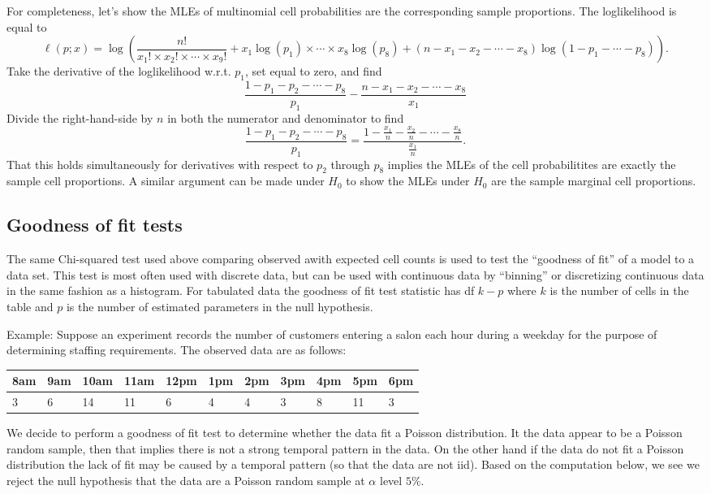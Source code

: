 \documentclass[]{book}
\begin{document}
For completeness, let's show the MLEs of multinomial cell probabilities
are the corresponding sample proportions. The loglikelihood is equal to
\[\ell(p;x) = \log \left(\frac{n!}{x_1!\times x_2!\times \cdots\times x_9!} + x_1\log(p_1) \times \cdots \times x_8 \log(p_8) + (n-x_1-x_2-\cdots -x_8)\log(1-p_1-\cdots -p_8)\right).\]
Take the derivative of the loglikelihood w.r.t. \(p_1\), set equal to
zero, and find
\[\frac{1 - p_1 - p_2 - \cdots - p_8}{p_1} - \frac{n-x_1-x_2-\cdots -x_8}{x_1}\]
Divide the right-hand-side by \(n\) in both the numerator and
denominator to find
\[\frac{1 - p_1 - p_2 - \cdots - p_8}{p_1} = \frac{1-\frac{x_1}{n} - \frac{x_2}{n}-\cdots - \frac{x_8}{n}}{\frac{x_1}{n}}.\]
That this holds simultaneously for derivatives with respect to \(p_2\)
through \(p_8\) implies the MLEs of the cell probabilitites are exactly
the sample cell proportions. A similar argument can be made under
\(H_0\) to show the MLEs under \(H_0\) are the sample marginal cell
proportions.

\subsection{Goodness of fit tests}\label{goodness-of-fit-tests}

The same Chi-squared test used above comparing observed awith expected
cell counts is used to test the ``goodness of fit'' of a model to a data
set. This test is most often used with discrete data, but can be used
with continuous data by ``binning'' or discretizing continuous data in
the same fashion as a histogram. For tabulated data the goodness of fit
test statistic has df \(k-p\) where \(k\) is the number of cells in the
table and \(p\) is the number of estimated parameters in the null
hypothesis.

Example: Suppose an experiment records the number of customers entering
a salon each hour during a weekday for the purpose of determining
staffing requirements. The observed data are as follows:

\begin{longtable}[]{@{}lllllllllll@{}}
\toprule
8am & 9am & 10am & 11am & 12pm & 1pm & 2pm & 3pm & 4pm & 5pm &
6pm\tabularnewline
\midrule
\endhead
3 & 6 & 14 & 11 & 6 & 4 & 4 & 3 & 8 & 11 & 3\tabularnewline
\bottomrule
\end{longtable}

We decide to perform a goodness of fit test to determine whether the
data fit a Poisson distribution. It the data appear to be a Poisson
random sample, then that implies there is not a strong temporal pattern
in the data. On the other hand if the data do not fit a Poisson
distribution the lack of fit may be caused by a temporal pattern (so
that the data are not iid). Based on the computation below, we see we
reject the null hypothesis that the data are a Poisson random sample at
\(\alpha\) level \(5\%\).
\end{document}
